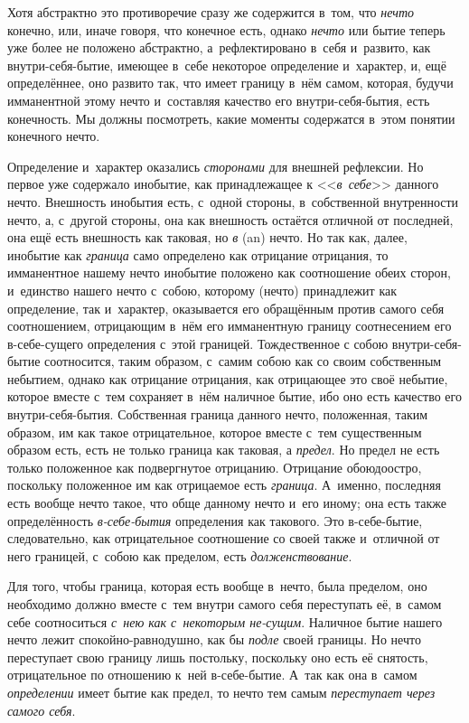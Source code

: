 \label{ssssec:beta}

Хотя абстрактно это противоречие сразу же содержится в~том, что
{\em нечто} конечно, или, иначе говоря, что конечное
есть, однако {\em нечто} или бытие теперь уже более не
положено абстрактно, а~рефлектировано в~себя и~развито, как
внутри-себя-бытие, имеющее в~себе некоторое определение и~характер, и, ещё
определённее, оно развито так, что имеет границу в~нём самом, которая,
будучи имманентной этому нечто и~составляя качество его внутри-себя-бытия,
есть конечность. Мы должны посмотреть, какие моменты содержатся в~этом
понятии конечного нечто.

Определение и~характер оказались {\em сторонами} для
внешней рефлексии. Но первое уже содержало инобытие, как принадлежащее к
<<{\em в~себе}>> данного нечто. Внешность инобытия есть,
с~одной стороны, в~собственной внутренности нечто, а, с~другой стороны, она
как внешность остаётся отличной от последней, она ещё есть внешность как
таковая, но {\em в} (an) нечто. Но так как, далее,
инобытие как {\em граница} само определено как
отрицание отрицания, то имманентное нашему нечто инобытие положено как
соотношение обеих сторон, и~единство нашего нечто с~собою, которому (нечто)
принадлежит как определение, так и~характер, оказывается его обращённым
против самого себя соотношением, отрицающим в~нём его имманентную границу
соотнесением его в-себе-сущего определения с~этой границей. Тождественное с
собою внутри-себя-бытие соотносится, таким образом, с~самим собою как со
своим собственным небытием, однако как отрицание отрицания, как отрицающее
это своё небытие, которое вместе с~тем сохраняет в~нём наличное бытие, ибо
оно есть качество его внутри-себя-бытия. Собственная граница данного нечто,
положенная, таким образом, им как такое отрицательное, которое вместе с~тем
существенным образом есть, есть не только граница как таковая, а
{\em предел}. Но предел не есть только положенное как
подвергнутое отрицанию. Отрицание обоюдоостро, поскольку положенное им как
отрицаемое есть {\em граница}. А~именно, последняя есть
вообще нечто такое, что обще данному нечто и~его иному; она есть также
определённость {\em в-себе-бытия} определения как
такового. Это в-себе-бытие, следовательно, как отрицательное соотношение со
своей также и~отличной от него границей, с~собою как пределом, есть
{\em долженствование}.

Для того, чтобы граница, которая есть вообще в~нечто, была пределом, оно
необходимо должно вместе с~тем внутри самого себя переступать её, в~самом
себе соотноситься {\em с~нею как с~некоторым не-сущим}.
Наличное бытие нашего нечто лежит спокойно-равнодушно, как бы
{\em подле} своей границы. Но нечто переступает свою
границу лишь постольку, поскольку оно есть её снятость, отрицательное по
отношению к~ней в-себе-бытие. А~так как она в~самом
{\em определении} имеет бытие как предел, то нечто тем
самым {\em переступает через самого себя}.

